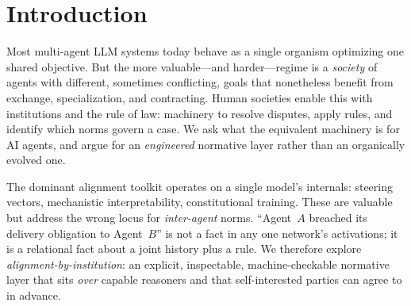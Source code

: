 \documentclass[11pt]{article}
\begin{document}
\begin{abstract}
escapes an obligation. An independent cross-family reviewer catches a blatant poison but
only \textbf{1 of 3} subtle structural ones (a deleted compensation chain, an inverted
superiority, a flipped condition)---so inspectability is necessary but \emph{not} sufficient.
Grounding the reviewer in the engine's \emph{computed} verdict on an agreed probe (engine-assisted
audit) restores detection to \textbf{3 of 3}, at some cost to precision---locating the defence in
differential testing, not free-form review. We are explicit that
several studies are single illustrative scenarios, and that the natural-language$\rightarrow$logic
formalization itself is studied more thoroughly by concurrent work; our novel emphasis is the
institutional and adversarial framing.
\end{abstract}

\section{Introduction}
Most multi-agent LLM systems today behave as a single organism optimizing one
shared objective. But the more valuable---and harder---regime is a \emph{society}
of agents with different, sometimes conflicting, goals that nonetheless benefit
from exchange, specialization, and contracting. Human societies enable this with
institutions and the rule of law: machinery to resolve disputes, apply rules, and
identify which norms govern a case. We ask what the equivalent machinery is for AI
agents, and argue for an \emph{engineered} normative layer rather than an organically
evolved one.

The dominant alignment toolkit operates on a single model's internals: steering
vectors, mechanistic interpretability, constitutional training. These are valuable
but address the wrong locus for \emph{inter-agent} norms. ``Agent~$A$ breached its
delivery obligation to Agent~$B$'' is not a fact in any one network's activations;
it is a relational fact about a joint history plus a rule. We therefore explore
\emph{alignment-by-institution}: an explicit, inspectable, machine-checkable
normative layer that sits \emph{over} capable reasoners and that self-interested
parties can agree to in advance.
\end{document}
